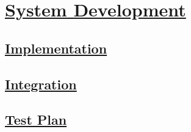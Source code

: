 \section[System Development]{\hyperlink{toc}{System Development}}
	\label{sec:systemDevelopment}
	
	\subsection[Implementation]{\hyperlink{toc}{Implementation}}
		\label{sec:implementation}
		
	\subsection[Integration]{\hyperlink{toc}{Integration}}
		\label{sec:integration}
		
	\subsection[Test Plan]{\hyperlink{toc}{Test Plan}}
		\label{sec:testPlan}		